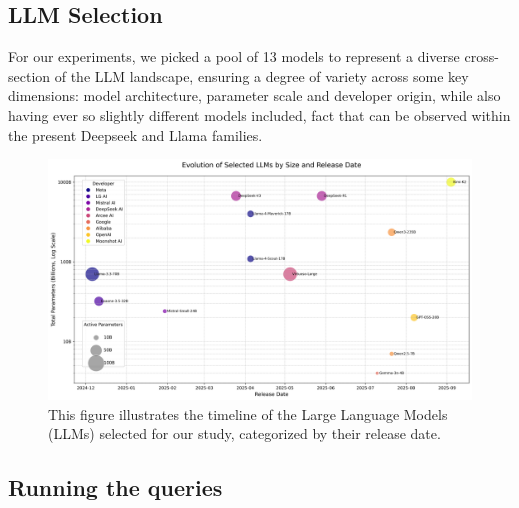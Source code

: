 \documentclass[11pt]{article}
\begin{document}
\subsection{LLM Selection} %
For our experiments, we picked a pool of 13 models to represent a diverse cross-section of the LLM landscape, ensuring a degree of variety across some key dimensions: model architecture, parameter scale and developer origin, while also having ever so slightly different models included, fact that can be observed within the present Deepseek \cite{deepseekai2025} and Llama families.
\begin{figure}[htbp]
    \centering
    \includegraphics[width=\textwidth]{../plot_generators/model_timeline_plot.png}
    \caption{This figure illustrates the timeline of the Large Language Models (LLMs) selected for our study, categorized by their release date.}
    \label{fig:model_timeline}
\end{figure}
\newpage

\subsection{Running the queries}
\end{document}
